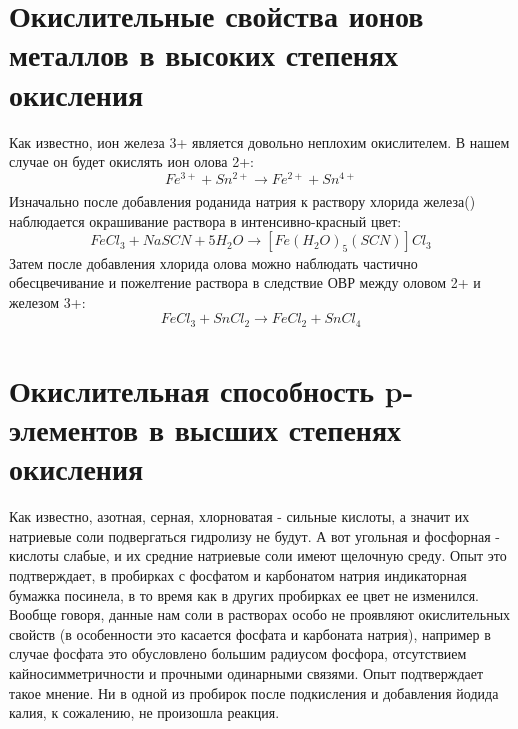 \documentclass[a4paper, 12pt]{article}
\newcommand{\RomanNumeralCaps}[1]
    {\MakeUppercase{\romannumeral #1}}
\begin{document}
\section{Окислительные свойства ионов металлов в высоких степенях окисления}
Как известно, ион железа 3+ является довольно неплохим окислителем. В нашем случае он будет окислять ион олова 2+:
\begin{equation}
    Fe^{3+} + Sn^{2+} \xrightarrow[]{} Fe^{2+} + Sn^{4+}
\end{equation}
 Изначально после добавления роданида натрия к раствору хлорида железа(\RomanNumeralCaps{3}) наблюдается окрашивание раствора в интенсивно-красный цвет:
\begin{equation}
    FeCl_3 + NaSCN +5H_2O \xrightarrow[]{} [Fe(H_2O)_5(SCN)]Cl_3
\end{equation}
Затем после добавления хлорида олова можно наблюдать частично обесцвечивание и пожелтение раствора в следствие ОВР между оловом 2+ и железом 3+:
\begin{equation}
    FeCl_3 + SnCl_2 \xrightarrow[]{} FeCl_2 + SnCl_4
\end{equation}
\section{Окислительная способность p-элементов в высших степенях окисления}
 Как известно, азотная, серная, хлорноватая - сильные кислоты, а значит их натриевые соли подвергаться гидролизу не будут. А вот угольная и фосфорная - кислоты слабые, и их средние натриевые соли имеют щелочную среду. Опыт это подтверждает, в пробирках с фосфатом и карбонатом натрия индикаторная бумажка посинела, в то время как в других пробирках ее цвет не изменился.
 Вообще говоря, данные нам соли в растворах особо не проявляют окислительных свойств (в особенности это касается фосфата и карбоната натрия), например в случае фосфата это обусловлено большим радиусом фосфора, отсутствием кайносимметричности и прочными одинарными связями. Опыт подтверждает такое мнение. Ни в одной из пробирок после подкисления и добавления йодида калия, к сожалению, не произошла реакция.
\end{document}
